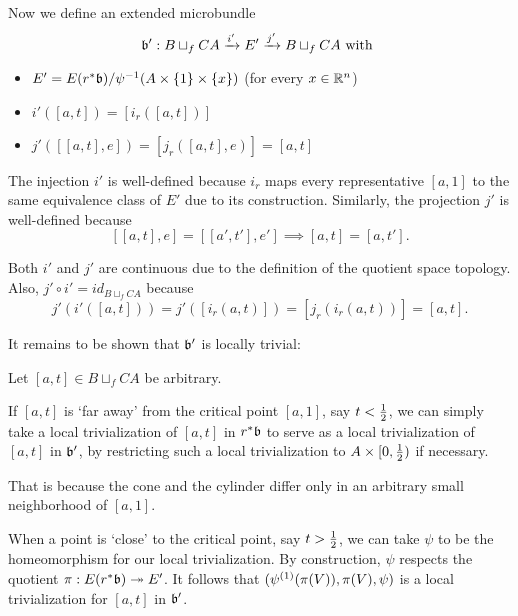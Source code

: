 \begin{myproof}
    Now we define an extended microbundle
    \[ \bundledef{\bb'}{B \sqcup_f CA}{E'}{i'}{j'} \twith \]
    \begin{itemize}
        \item $E' = E(\ind{r}\bb) / \inv{\psi}(A \cross \{1\} \cross \{x\})$ (for every $x \in \mathbb{R}^n$)
        \item $i'([a, t]) = [i_r([a, t])]$
        \item $j'([[a, t], e]) = [j_r([a, t], e)] = [a, t]$
    \end{itemize}
    The injection $i'$ is well-defined because $i_r$ maps every
    representative $[a, 1]$ to the same equivalence
    class of $E'$ due to its construction.
    Similarly, the projection $j'$ is well-defined because
    \[ [[a, t], e] = [[a', t'], e'] \implies  [a, t] = [a, t']. \]

    Both $i'$ and $j'$ are continuous
    due to the definition of the quotient space topology.
    Also, $j' \circ i' = id_{B \sqcup_f CA}$ because
    \[ j'(i'([a, t])) = j'([i_r(a, t)]) = [j_r(i_r(a, t))] = [a, t]. \]
    
    It remains to be shown that $\bb'$ is locally trivial:

    Let $[a, t] \in B \sqcup_f CA$ be arbitrary.

    If $[a, t]$ is `far away' from the critical point $[a, 1]$,
    say $t < \frac{1}{2}$, we can simply take a local trivialization of $[a, t]$ in $\ind{r}\bb$
    to serve as a local trivialization of $[a, t]$ in $\bb'$,
    by restricting such a local trivialization to $A \times [0, \frac{1}{2})$ if necessary.

    That is because the cone and the cylinder differ only
    in an arbitrary small neighborhood of $[a, 1]$.

    When a point is `close' to the critical point, say $t > \frac{1}{2}$,
    we can take $\psi$ to be the homeomorphism for our local trivialization.
    By construction, $\psi$ respects the quotient $\pi: E(\ind{r}\bb) \subm E'$.
    It follows that $(\psi^{(1)}(\pi(V)), \pi(V), \psi)$
    is a local trivialization for $[a, t]$ in $\bb'$.
\end{myproof}